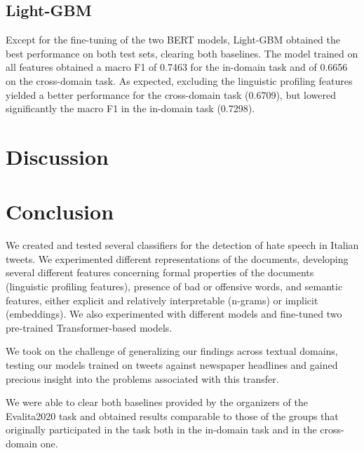 \documentclass[a4paper, 9pt, twocolumn, DIV=calc]{scrartcl}
\begin{document}
\subsection{Light-GBM}
Except for the fine-tuning of the two BERT models, Light-GBM obtained the best performance on both test sets, clearing both baselines.
The model trained on all features obtained a macro F1 of 0.7463 for the in-domain task and of 0.6656 on the cross-domain task.
As expected, excluding the linguistic profiling features yielded a better performance for the cross-domain task (0.6709), but lowered significantly the macro F1 in the in-domain task (0.7298).



\section{Discussion}


\section{Conclusion}
We created and tested several classifiers for the detection of hate speech in Italian tweets.
We experimented different representations of the documents, developing several different features concerning formal properties of the documents (linguistic profiling features), presence of bad or offensive words, and semantic features, either explicit and relatively interpretable (n-grams) or implicit (embeddings).
We also experimented with different models and fine-tuned two pre-trained Transformer-based models.

We took on the challenge of generalizing our findings across textual domains, testing our models trained on tweets against newspaper headlines and gained precious insight into the problems associated with this transfer.

We were able to clear both baselines provided by the organizers of the Evalita2020 task and obtained results comparable to those of the groups that originally participated in the task both in the in-domain task and in the cross-domain one.

\printbibliography{}
\end{document}
